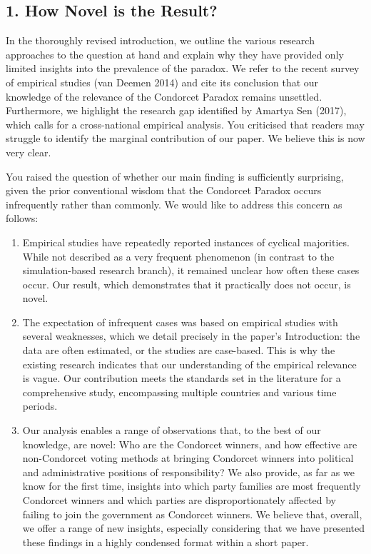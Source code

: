 \documentclass[a4paper, 12pt]{scrartcl}
\begin{document}
\subsection*{1. How Novel is the Result?}
In the thoroughly revised introduction, we outline the various research approaches to the question at hand and explain why they have provided only limited insights into the prevalence of the paradox. We refer to the recent survey of empirical studies (van Deemen 2014) and cite its conclusion that our knowledge of the relevance of the Condorcet Paradox remains unsettled. Furthermore, we highlight the research gap identified by Amartya Sen (2017), which calls for a cross-national empirical analysis. You criticised that readers may struggle to identify the marginal contribution of our paper. We believe this is now very clear.

You raised the question of whether our main finding is sufficiently surprising, given the prior conventional wisdom that the Condorcet Paradox occurs infrequently rather than commonly. We would like to address this concern as follows:
\begin{enumerate}
	\item Empirical studies have repeatedly reported instances of cyclical majorities. While not described as a very frequent phenomenon (in contrast to the simulation-based research branch), it remained unclear how often these cases occur. Our result, which demonstrates that it practically does not occur, is novel.
	\item The expectation of infrequent cases was based on empirical studies with several weaknesses, which we detail precisely in the paper's Introduction: the data are often estimated, or the studies are case-based. This is why the existing research indicates that our understanding of the empirical relevance is vague. Our contribution meets the standards set in the literature for a comprehensive study, encompassing multiple countries and various time periods.
	\item Our analysis enables a range of observations that, to the best of our knowledge, are novel: Who are the Condorcet winners, and how effective are non-Condorcet voting methods at bringing Condorcet winners into political and administrative positions of responsibility? We also provide, as far as we know for the first time, insights into which party families are most frequently Condorcet winners and which parties are disproportionately affected by failing to join the government as Condorcet winners. We believe that, overall, we offer a range of new insights, especially considering that we have presented these findings in a highly condensed format within a short paper.
\end{enumerate}
\end{document}
